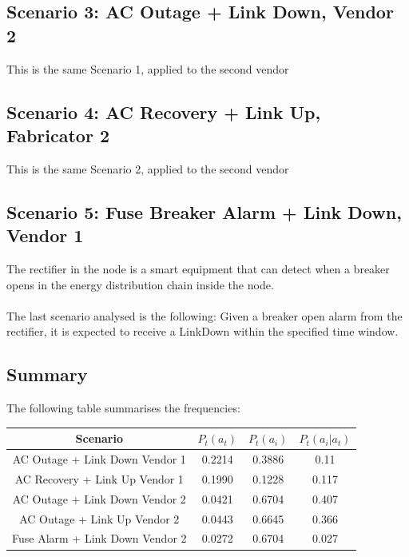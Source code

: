 \documentclass[10pt,a4paper]{report}
\begin{document}
\subsection{Scenario 3: AC Outage + Link Down, Vendor 2} 
This is the same Scenario 1, applied to the second vendor

\subsection{Scenario 4: AC Recovery + Link Up, Fabricator 2} 

This is the same Scenario 2, applied to the second vendor

\subsection{Scenario 5: Fuse Breaker Alarm + Link Down, Vendor 1} 
The rectifier in the node is a smart equipment that can detect when a breaker opens in the energy distribution chain inside the node.
\\\\
The last scenario analysed is the following: Given a breaker open alarm from the rectifier, it is expected to receive a LinkDown within the specified time window.

\subsection{Summary}

The following table summarises the frequencies:

\begin{center}
 \begin{tabular}{||c | c | c | c ||} 
 \hline\hline
 Scenario  & $P_t(a_t)$ & $P_t(a_i)$ & $P_t(a_i|a_t)$ \\ 
 \hline
 AC Outage + Link Down Vendor 1 & 0.2214 & 0.3886 & 0.11 \\  
 \hline
 AC Recovery + Link Up Vendor 1 & 0.1990 & 0.1228 & 0.117 \\  
 \hline
 AC Outage + Link Down Vendor 2 & 0.0421 & 0.6704 & 0.407 \\  
 \hline
 AC Outage + Link Up Vendor 2 & 0.0443 & 0.6645 & 0.366 \\  
 \hline
 Fuse Alarm + Link Down Vendor 2 & 0.0272 & 0.6704 & 0.027 \\  

 \hline\hline
\end{tabular}
\end{center}
\end{document}
